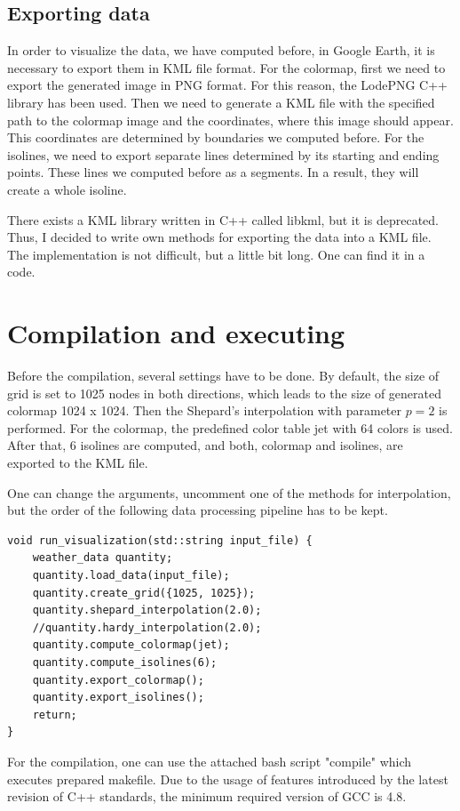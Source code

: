 \documentclass[a4paper, 10pt]{article}
\begin{document}
\subsection{Exporting data}
In order to visualize the data, we have computed before, in Google Earth, it is necessary to export them in KML file format. For the colormap, first we need to export the generated image in PNG format. For this reason, the LodePNG C++ library has been used. Then we need to generate a KML file with the specified path to the colormap image and the coordinates, where this image should appear. This coordinates are determined by boundaries we computed before. For the isolines, we need to export separate lines determined by its starting and ending points. These lines we computed before as a segments. In a result, they will create a whole isoline.

There exists a KML library written in C++ called libkml, but it is deprecated. Thus, I decided to write own methods for exporting the data into a KML file. The implementation is not difficult, but a little bit long. One can find it in a code. 

\section{Compilation and executing}
Before the compilation, several settings have to be done. By default, the size of grid is set to 1025 nodes in both directions, which leads to the size of generated colormap 1024 x 1024. Then the Shepard's interpolation with parameter $ p = 2 $ is performed. For the colormap, the predefined color table jet with 64 colors is used. After that, 6 isolines are computed, and both, colormap and isolines, are exported to the KML file. 

One can change the arguments, uncomment one of the methods for interpolation, but the order of the following data processing pipeline has to be kept.
\begin{lstlisting}[caption = data processing pipeline]
void run_visualization(std::string input_file) {
	weather_data quantity;
	quantity.load_data(input_file);
	quantity.create_grid({1025, 1025});
	quantity.shepard_interpolation(2.0);
	//quantity.hardy_interpolation(2.0);
	quantity.compute_colormap(jet);
	quantity.compute_isolines(6);
	quantity.export_colormap();
	quantity.export_isolines();
	return;
}
\end{lstlisting}

For the compilation, one can use the attached bash script "compile" which executes prepared makefile. Due to the usage of features introduced by the latest revision of C++ standards, the minimum required version of GCC is 4.8.
\end{document}
